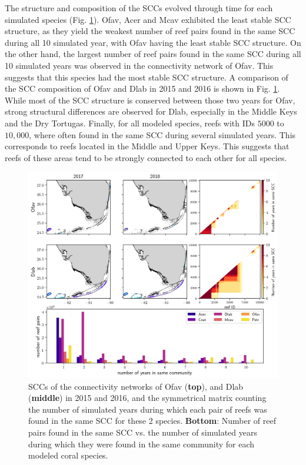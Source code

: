 \documentclass[fleqn,10pt]{wlscirep}
\begin{document}
The structure and composition of the SCCs evolved through time for each simulated species (Fig. \ref{fig:scc}). Ofav, Acer and Mcav exhibited the least stable SCC structure, as they yield the weakest number of reef pairs found in the same SCC during all 10 simulated year, with Ofav having the least stable SCC structure. On the other hand, the largest number of reef pairs found in the same SCC during all 10 simulated years was observed in the connectivity network of Ofav. This suggests that this species had the most stable SCC structure. A comparison of the SCC composition of Ofav and Dlab in 2015 and 2016 is shown in Fig. \ref{fig:scc}. While most of the SCC structure is conserved between those two years for Ofav, strong structural differences are observed for Dlab, especially in the Middle Keys and the Dry Tortugas. Finally, for all modeled species, reefs with IDs $5000$ to $10,000$, where often found in the same SCC during several simulated years. This corresponds to reefs located in the Middle and Upper Keys. This suggests that reefs of these areas tend to be strongly connected to each other for all species. 

\begin{figure}
    \centering
    \includegraphics[width=\textwidth]{figures/comparison_sccs.png}
    \caption{SCCs of the connectivity networks of Ofav (\textbf{top}), and Dlab (\textbf{middle}) in 2015 and 2016, and the symmetrical matrix counting the number of simulated years during which each pair of reefs was found in the same SCC for these 2 species. \textbf{Bottom}: Number of reef pairs found in the same SCC vs. the number of simulated years during which they were found in the same community for each modeled coral species.}\label{fig:scc}
\end{figure}
\end{document}
